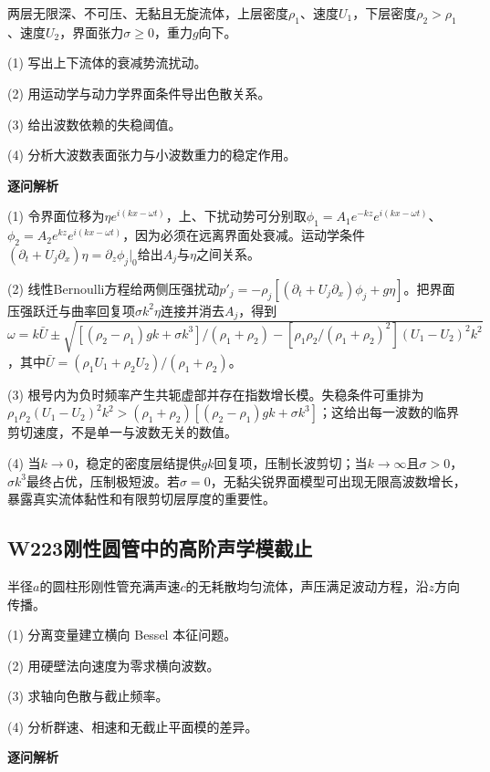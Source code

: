 两层无限深、不可压、无黏且无旋流体，上层密度$\rho_1$、速度$U_1$，下层密度$\rho_2>\rho_1$、速度$U_2$，界面张力$\sigma\ge0$，重力$g$向下。

(1) 写出上下流体的衰减势流扰动。

(2) 用运动学与动力学界面条件导出色散关系。

(3) 给出波数依赖的失稳阈值。

(4) 分析大波数表面张力与小波数重力的稳定作用。

\par\textbf{逐问解析}

(1) 令界面位移为$\eta e^{i(kx-\omega t)}$，上、下扰动势可分别取$\phi_1=A_1e^{-kz}e^{i(kx-\omega t)}$、$\phi_2=A_2e^{kz}e^{i(kx-\omega t)}$，因为必须在远离界面处衰减。运动学条件$(\partial_t+U_j\partial_x)\eta=\partial_z\phi_j|_0$给出$A_j$与$\eta$之间关系。

(2) 线性Bernoulli方程给两侧压强扰动$p'_j=-\rho_j[(\partial_t+U_j\partial_x)\phi_j+g\eta]$。把界面压强跃迁与曲率回复项$\sigma k^2\eta$连接并消去$A_j$，得到$\omega=k\bar U\pm\sqrt{[(\rho_2-\rho_1)gk+\sigma k^3]/(\rho_1+\rho_2)-[\rho_1\rho_2/(\rho_1+\rho_2)^2](U_1-U_2)^2k^2}$，其中$\bar U=(\rho_1U_1+\rho_2U_2)/(\rho_1+\rho_2)$。

(3) 根号内为负时频率产生共轭虚部并存在指数增长模。失稳条件可重排为$\rho_1\rho_2(U_1-U_2)^2k^2>(\rho_1+\rho_2)[(\rho_2-\rho_1)gk+\sigma k^3]$；这给出每一波数的临界剪切速度，不是单一与波数无关的数值。

(4) 当$k\to0$，稳定的密度层结提供$gk$回复项，压制长波剪切；当$k\to\infty$且$\sigma>0$，$\sigma k^3$最终占优，压制极短波。若$\sigma=0$，无黏尖锐界面模型可出现无限高波数增长，暴露真实流体黏性和有限剪切层厚度的重要性。

\par\medskip

\subsection*{W223\quad 刚性圆管中的高阶声学模截止}

半径$a$的圆柱形刚性管充满声速$c$的无耗散均匀流体，声压满足波动方程，沿$z$方向传播。

(1) 分离变量建立横向 Bessel 本征问题。

(2) 用硬壁法向速度为零求横向波数。

(3) 求轴向色散与截止频率。

(4) 分析群速、相速和无截止平面模的差异。

\par\textbf{逐问解析}

